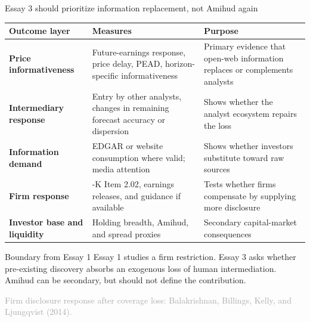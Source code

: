 \documentclass[aspectratio=169,10pt]{beamer}
\newcommand{\source}[1]{\vfill{\scriptsize\textcolor{DarkGray}{#1}}}
\begin{document}
\begin{frame}[t]{Essay 3 should prioritize information replacement, not Amihud again}
\scriptsize
\renewcommand{\arraystretch}{1.18}
\setlength{\tabcolsep}{0.10cm}
\begin{tabularx}{\textwidth}{>{\bfseries\RaggedRight\arraybackslash}p{2.55cm} >{\RaggedRight\arraybackslash}X >{\RaggedRight\arraybackslash}X}
\toprule
Outcome layer & Measures & Purpose \\
\midrule
Price informativeness & Future-earnings response, price delay, PEAD, horizon-specific informativeness & Primary evidence that open-web information replaces or complements analysts \\
Intermediary response & Entry by other analysts, changes in remaining forecast accuracy or dispersion & Shows whether the analyst ecosystem repairs the loss \\
Information demand & EDGAR or website consumption where valid; media attention & Shows whether investors substitute toward raw sources \\
Firm response & 8-K Item 2.02, earnings releases, and guidance if available & Tests whether firms compensate by supplying more disclosure \\
Investor base and liquidity & Holding breadth, Amihud, and spread proxies & Secondary capital-market consequences \\
\bottomrule
\end{tabularx}

\begin{exampleblock}{Boundary from Essay 1}
\scriptsize Essay 1 studies a firm restriction. Essay 3 asks whether pre-existing discovery absorbs an exogenous loss of human intermediation. Amihud can be secondary, but should not define the contribution.
\end{exampleblock}

\source{Firm disclosure response after coverage loss: Balakrishnan, Billings, Kelly, and Ljungqvist (2014).}
\end{frame}
\end{document}
